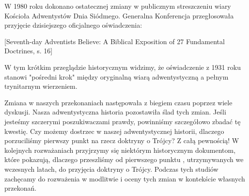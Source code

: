 W 1980 roku dokonano ostatecznej zmiany w publicznym streszczeniu wiary Kościoła Adwentystów Dnia Siódmego. Generalna Konferencja przegłosowała przyjęcie dzisiejszego oficjalnego oświadczenia:

[Seventh-day Adventists Believe: A Biblical Exposition of 27 Fundamental Doctrines, s. 16]

W tym krótkim  przeglądzie historycznym widzimy, że oświadczenie z 1931 roku stanowi "pośredni krok" między oryginalną wiarą adwentystyczną  a pełnym trynitarnym wierzeniem.

Zmiana w naszych przekonaniach następowała z biegiem czasu poprzez wiele dyskusji. Nasza adwentystyczna historia pozostawiła ślad tych zmian. Jeśli jesteśmy szczerymi poszukiwaczami prawdy, powinniśmy szczegółowo zbadać tę kwestię. Czy możemy dostrzec w naszej adwentystycznej historii, dlaczego porzuciliśmy pierwszy punkt  na rzecz doktryny o Trójcy? Z całą pewnością! W kolejnych rozważaniach przyjrzymy się niektórym historycznym dokumentom, które pokazują, dlaczego przeszliśmy od pierwszego punktu , utrzymywanych we wczesnych latach, do przyjęcia doktryny o Trójcy. Podczas tych studiów zachęcamy do rozważenia w  modlitwie i oceny tych zmian w kontekście własnych przekonań.
